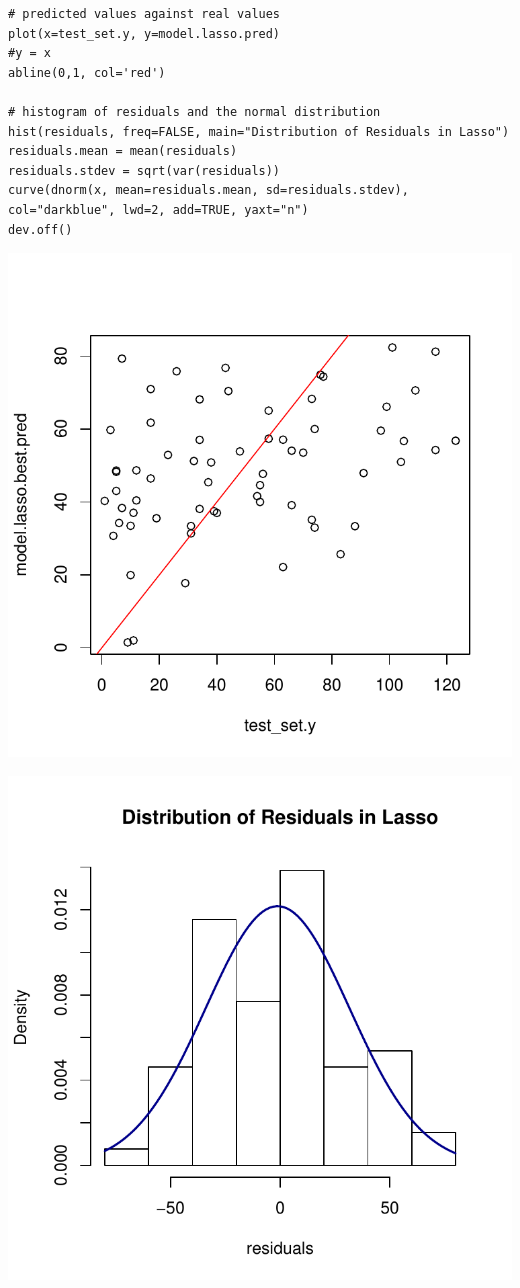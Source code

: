\documentclass[]{report}
\begin{document}
\begin{lstlisting}
# predicted values against real values
plot(x=test_set.y, y=model.lasso.pred)
#y = x
abline(0,1, col='red')

# histogram of residuals and the normal distribution
hist(residuals, freq=FALSE, main="Distribution of Residuals in Lasso")
residuals.mean = mean(residuals)
residuals.stdev = sqrt(var(residuals))
curve(dnorm(x, mean=residuals.mean, sd=residuals.stdev), col="darkblue", lwd=2, add=TRUE, yaxt="n")
dev.off()
\end{lstlisting}

\begin{center}
	\includegraphics[width=0.8\linewidth]{Figures/lasso_predicted.pdf}
\end{center}

\begin{center}
	\includegraphics[width=0.8\linewidth]{Figures/lasso_residuals.pdf}
\end{center}
\end{document}
